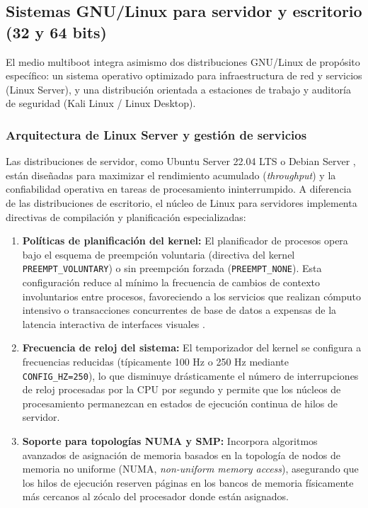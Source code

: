 \documentclass[12pt]{article}
\begin{document}
\subsection{Sistemas GNU/Linux para servidor y escritorio (32 y 64 bits)}
\label{sec:linuxServidorEscritorio}

El medio multiboot integra asimismo dos distribuciones GNU/Linux de propósito específico: un sistema operativo optimizado para infraestructura de red y servicios (Linux Server), y una distribución orientada a estaciones de trabajo y auditoría de seguridad (Kali Linux / Linux Desktop).

\subsubsection{Arquitectura de Linux Server y gestión de servicios}

Las distribuciones de servidor, como Ubuntu Server 22.04 LTS o Debian Server \parencite{canonical2024server}, están diseñadas para maximizar el rendimiento acumulado (\textit{throughput}) y la confiabilidad operativa en tareas de procesamiento ininterrumpido. A diferencia de las distribuciones de escritorio, el núcleo de Linux para servidores implementa directivas de compilación y planificación especializadas:
\begin{enumerate}[noitemsep, topsep=2pt]
    \item \textbf{Políticas de planificación del kernel:} El planificador de procesos opera bajo el esquema de preempción voluntaria (directiva del kernel \texttt{PREEMPT\_VOLUNTARY}) o sin preempción forzada (\texttt{PREEMPT\_NONE}). Esta configuración reduce al mínimo la frecuencia de cambios de contexto involuntarios entre procesos, favoreciendo a los servicios que realizan cómputo intensivo o transacciones concurrentes de base de datos a expensas de la latencia interactiva de interfaces visuales \parencite[\S 3.2, p.\ 132]{stallings2018operating}.
    \item \textbf{Frecuencia de reloj del sistema:} El temporizador del kernel se configura a frecuencias reducidas (típicamente 100 Hz o 250 Hz mediante \texttt{CONFIG\_HZ=250}), lo que disminuye drásticamente el número de interrupciones de reloj procesadas por la CPU por segundo y permite que los núcleos de procesamiento permanezcan en estados de ejecución continua de hilos de servidor.
    \item \textbf{Soporte para topologías NUMA y SMP:} Incorpora algoritmos avanzados de asignación de memoria basados en la topología de nodos de memoria no uniforme (NUMA, \textit{non-uniform memory access}), asegurando que los hilos de ejecución reserven páginas en los bancos de memoria físicamente más cercanos al zócalo del procesador donde están asignados.
\end{enumerate}
\end{document}
